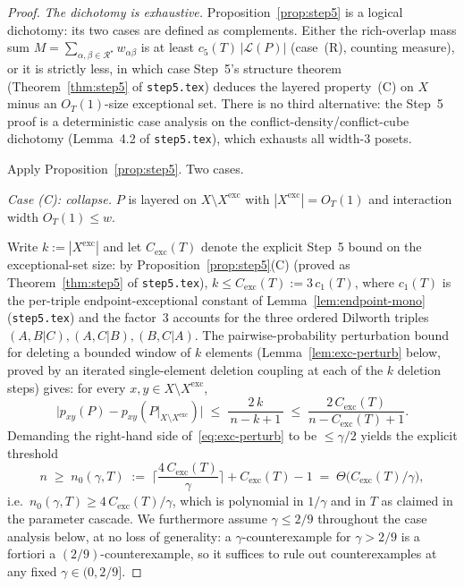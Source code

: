 \begin{proof}
\medskip\noindent\emph{The dichotomy is exhaustive.}
Proposition~\ref{prop:step5} is a logical dichotomy: its two cases are
defined as complements. Either the rich-overlap mass sum
$M = \sum_{\alpha,\beta \in \mathcal{R}^\star} w_{\alpha\beta}$ is at
least $c_5(T)\,|\mathcal{L}(P)|$ (case~(R), counting measure), or it
is strictly less, in which case Step~5's structure theorem
(Theorem~\ref{thm:step5} of \texttt{step5.tex}) deduces the
layered property~(C) on $X$ minus an $O_T(1)$-size exceptional set.
There is no third alternative: the Step~5 proof is a deterministic
case analysis on the conflict-density/conflict-cube dichotomy
(Lemma~4.2 of \texttt{step5.tex}), which exhausts all width-$3$ posets.

\smallskip
Apply Proposition~\ref{prop:step5}. Two cases.

\medskip\noindent\emph{Case (C): collapse.} $P$ is layered on
$X \setminus X^{\mathrm{exc}}$ with $|X^{\mathrm{exc}}| = O_T(1)$ and
interaction width $O_T(1) \le w$.

Write $k := |X^{\mathrm{exc}}|$ and let $C_{\mathrm{exc}}(T)$ denote
the explicit Step~5 bound on the exceptional-set size: by
Proposition~\ref{prop:step5}(C) (proved as
Theorem~\ref{thm:step5} of \texttt{step5.tex}),
$k \le C_{\mathrm{exc}}(T) := 3\,c_1(T)$, where $c_1(T)$ is the
per-triple endpoint-exceptional constant of
Lemma~\ref{lem:endpoint-mono} (\texttt{step5.tex}) and the factor~$3$
accounts for the three ordered Dilworth triples
$(A,B|C),(A,C|B),(B,C|A)$. The pairwise-probability
perturbation bound for deleting a bounded window of $k$ elements
(Lemma~\ref{lem:exc-perturb} below, proved by an iterated
single-element deletion coupling at each of the $k$ deletion
steps) gives: for every $x,y \in X \setminus X^{\mathrm{exc}}$,
\begin{equation}\label{eq:exc-perturb}
  \big|p_{xy}(P) - p_{xy}(P|_{X \setminus X^{\mathrm{exc}}})\big|
  \;\le\; \frac{2\,k}{\,n - k + 1\,}
  \;\le\; \frac{2\,C_{\mathrm{exc}}(T)}{n - C_{\mathrm{exc}}(T) + 1}.
\end{equation}
Demanding the right-hand side of~\eqref{eq:exc-perturb} to be
$\le \gamma/2$ yields the explicit threshold
\begin{equation}\label{eq:n0-main}
  n \;\ge\; n_0(\gamma, T)
  \;:=\; \Big\lceil \frac{4\,C_{\mathrm{exc}}(T)}{\gamma} \Big\rceil
  + C_{\mathrm{exc}}(T) - 1
  \;=\; \Theta\!\big(C_{\mathrm{exc}}(T)/\gamma\big),
\end{equation}
i.e.\ $n_0(\gamma, T) \ge 4\,C_{\mathrm{exc}}(T)/\gamma$, which is
polynomial in $1/\gamma$ and in $T$ as claimed in the parameter
cascade. We furthermore assume $\gamma \le 2/9$ throughout the
case analysis below, at no loss of generality: a
$\gamma$-counter\-example for $\gamma > 2/9$ is a fortiori a
$(2/9)$-counter\-example, so it suffices to rule out counter\-examples
at any fixed $\gamma \in (0, 2/9]$.


\end{proof}
